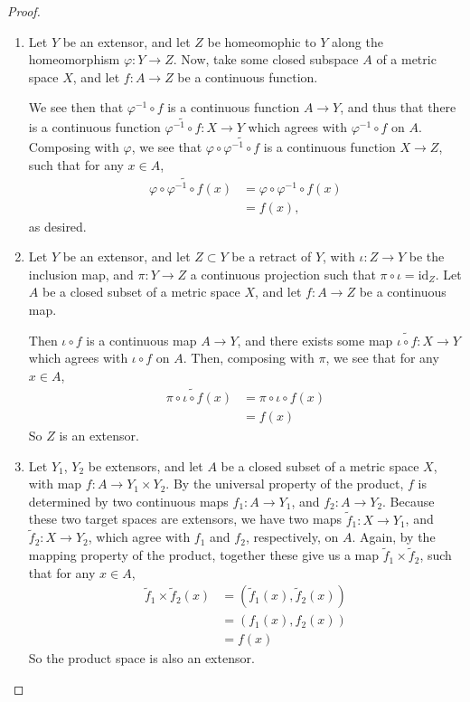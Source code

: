 \documentclass[12pt]{article}
\theoremstyle{definition}
\begin{document}
\begin{proof}
    \begin{enumerate}[label=(\roman*)]
        \item Let $Y$ be an extensor, and let $Z$ be homeomophic to $Y$ along the homeomorphism $\varphi: Y \to Z$. Now, take some closed subspace $A$ of a metric space $X$, and let $f : A \to Z$ be a continuous function. 
        \par We see then that $\varphi^{-1} \circ f$ is a continuous function $A \to Y$, and thus that there is a continuous function $\widetilde {\varphi^{-1}\circ  f} : X \to Y$ which agrees with $\varphi^{-1} \circ f$ on $A$. Composing with $\varphi$, we see that $\varphi \circ \widetilde{\varphi^{-1} \circ f}$ is a continuous function $X \to Z$, such that for any $x \in A$,
        \begin{align*}
        \varphi \circ \widetilde {\varphi^{-1} \circ f} (x) &= \varphi \circ \varphi^{-1} \circ f(x)\\ &= f(x),
        \end{align*}as desired. 
        \item Let $Y$ be an extensor, and let $Z \subset Y$ be a retract of $Y$, with $\iota : Z \to Y$ be the inclusion map, and $ \pi : Y \to Z$ a continuous projection such that $\pi \circ \iota = \text{id}_Z$. Let $A$ be a closed subset of a metric space $X$, and let $f: A \to Z$ be a continuous map.
        \par  Then $\iota \circ f$ is a continuous map $A \to Y$, and there exists some map $\widetilde {\iota \circ f} : X \to Y$ which agrees with $\iota \circ f$ on $A$. Then, composing with $\pi$, we see that for any $x \in A$,
        \begin{align*}
            \pi \circ \widetilde {\iota \circ f} (x) &= \pi \circ \iota \circ f (x) \\
            &= f(x)
        \end{align*}
        So $Z$ is an extensor.
        \item Let $Y_1$, $Y_2$ be extensors, and let $A$ be a closed subset of a metric space $X$, with map $f : A \to Y_1 \times Y_2$. By the universal property of the product, $f$ is determined by two continuous maps $f_1 : A \to Y_1$, and $f_2 : A \to Y_2$. Because these two target spaces are extensors, we have two maps $\tilde f_1 : X \to Y_1$, and $\tilde f_2 : X \to Y_2$, which agree with $f_1$ and $f_2$, respectively, on $A$. Again, by the mapping property of the product, together these give us a map $\tilde f_1 \times \tilde f_2$, such that for any $x \in A$,\
        \begin{align*}
            \tilde f_1 \times \tilde f_2 (x) &= (\tilde f_1(x), \tilde f_2(x))\\
            &= (f_1(x), f_2(x))\\
            &= f(x)
        \end{align*}
        So the product space is also an extensor.
    \end{enumerate}
\end{proof}
\end{document}

